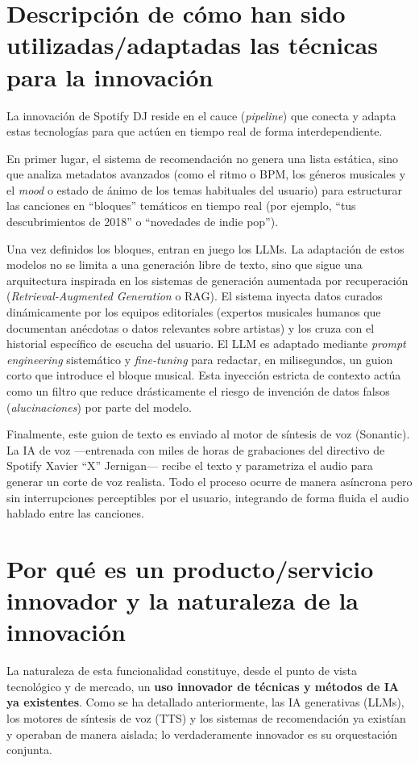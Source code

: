 \documentclass[12pt,a4paper]{article}
\begin{document}
\newpage

\section{Descripción de cómo han sido utilizadas/adaptadas las técnicas para la innovación}
La innovación de Spotify DJ reside en el cauce (\textit{pipeline}) que conecta y adapta estas tecnologías para que actúen en tiempo real de forma interdependiente.

En primer lugar, el sistema de recomendación no genera una lista estática, sino que analiza metadatos avanzados (como el ritmo o BPM, los géneros musicales y el \textit{mood} o estado de ánimo de los temas habituales del usuario) para estructurar las canciones en ``bloques'' temáticos en tiempo real (por ejemplo, ``tus descubrimientos de 2018'' o ``novedades de indie pop'').

Una vez definidos los bloques, entran en juego los LLMs. La adaptación de estos modelos no se limita a una generación libre de texto, sino que sigue una arquitectura inspirada en los sistemas de generación aumentada por recuperación (\textit{Retrieval-Augmented Generation} o RAG). El sistema inyecta datos curados dinámicamente por los equipos editoriales (expertos musicales humanos que documentan anécdotas o datos relevantes sobre artistas) y los cruza con el historial específico de escucha del usuario. El LLM es adaptado mediante \textit{prompt engineering} sistemático y \textit{fine-tuning} para redactar, en milisegundos, un guion corto que introduce el bloque musical. Esta inyección estricta de contexto actúa como un filtro que reduce drásticamente el riesgo de invención de datos falsos (\textit{alucinaciones}) por parte del modelo.

Finalmente, este guion de texto es enviado al motor de síntesis de voz (Sonantic). La IA de voz —entrenada con miles de horas de grabaciones del directivo de Spotify Xavier ``X'' Jernigan— recibe el texto y parametriza el audio para generar un corte de voz realista. Todo el proceso ocurre de manera asíncrona pero sin interrupciones perceptibles por el usuario, integrando de forma fluida el audio hablado entre las canciones.

\newpage

\section{Por qué es un producto/servicio innovador y la naturaleza de la innovación}
La naturaleza de esta funcionalidad constituye, desde el punto de vista tecnológico y de mercado, un \textbf{uso innovador de técnicas y métodos de IA ya existentes}. Como se ha detallado anteriormente, las IA generativas (LLMs), los motores de síntesis de voz (TTS) y los sistemas de recomendación ya existían y operaban de manera aislada; lo verdaderamente innovador es su orquestación conjunta.
\end{document}
